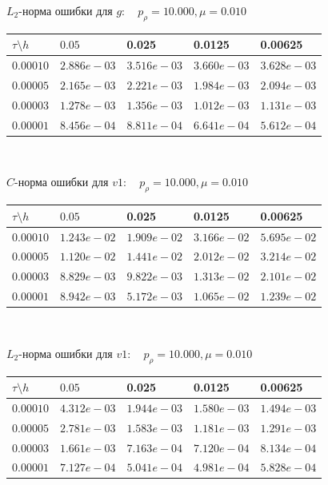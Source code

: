 \documentclass[a4paper, 25pt]{article}
\begin{document}
\begin{center}
 $L_2$-норма ошибки для $g: \quad p_{\rho}=10.000, \mu = 0.010 $
\begin{tabular}{|p{0.6in}|p{0.7in}|p{0.7in}|p{0.7in}|p{0.7in}|} \hline
$\tau\setminus h$ & $0.05$ & 0.025& 0.0125 & 0.00625 \\ \hline
$0.00010$ & $2.886e-03$ &$3.516e-03$ &$3.660e-03$ &$3.628e-03$  \\ \hline
$0.00005$ & $2.165e-03$ &$2.221e-03$ &$1.984e-03$ &$2.094e-03$  \\ \hline
$0.00003$ & $1.278e-03$ &$1.356e-03$ &$1.012e-03$ &$1.131e-03$  \\ \hline
$0.00001$ & $8.456e-04$ &$8.811e-04$ &$6.641e-04$ &$5.612e-04$  \\ \hline
\end{tabular}\\[20pt]
\end{center}

\begin{center}
$C$-норма ошибки для $v1: \quad p_{\rho}=10.000, \mu = 0.010 $
\begin{tabular}{|p{0.6in}|p{0.7in}|p{0.7in}|p{0.7in}|p{0.7in}|} \hline
$\tau\setminus h$ & $0.05$ & 0.025& 0.0125 & 0.00625 \\ \hline
$0.00010$ & $1.243e-02$ &$1.909e-02$ &$3.166e-02$ &$5.695e-02$  \\ \hline
$0.00005$ & $1.120e-02$ &$1.441e-02$ &$2.012e-02$ &$3.214e-02$  \\ \hline
$0.00003$ & $8.829e-03$ &$9.822e-03$ &$1.313e-02$ &$2.101e-02$  \\ \hline
$0.00001$ & $8.942e-03$ &$5.172e-03$ &$1.065e-02$ &$1.239e-02$  \\ \hline
\end{tabular}\\[20pt]
\end{center}

\begin{center}
 $L_2$-норма ошибки для $v1: \quad p_{\rho}=10.000, \mu = 0.010 $
\begin{tabular}{|p{0.6in}|p{0.7in}|p{0.7in}|p{0.7in}|p{0.7in}|} \hline
$\tau\setminus h$ & $0.05$ & 0.025& 0.0125 & 0.00625 \\ \hline
$0.00010$ & $4.312e-03$ &$1.944e-03$ &$1.580e-03$ &$1.494e-03$  \\ \hline
$0.00005$ & $2.781e-03$ &$1.583e-03$ &$1.181e-03$ &$1.291e-03$  \\ \hline
$0.00003$ & $1.661e-03$ &$7.163e-04$ &$7.120e-04$ &$8.134e-04$  \\ \hline
$0.00001$ & $7.127e-04$ &$5.041e-04$ &$4.981e-04$ &$5.828e-04$  \\ \hline
\end{tabular}\\[20pt]
\end{center}
\end{document}
